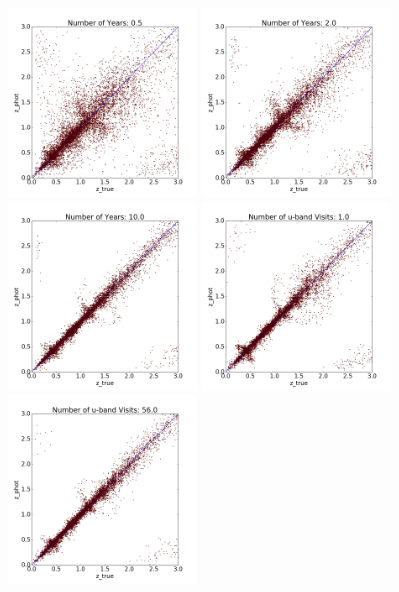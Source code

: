 \begin{figure}[h]
\begin{center}
\includegraphics[width=5cm]{figs/photoz/nyears_cat05.png}
\includegraphics[width=5cm]{figs/photoz/nyears_cat20.png}
\includegraphics[width=5cm]{figs/photoz/nyears_cat100.png}
\includegraphics[width=5cm]{figs/photoz/uvisits_cat1.png}
\includegraphics[width=5cm]{figs/photoz/uvisits_cat4.png}

\end{center}
\end{figure}
